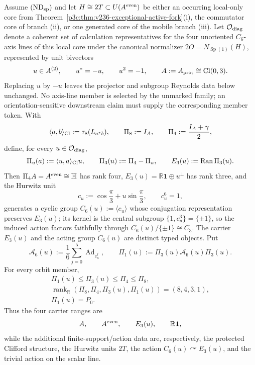 \documentclass[12pt,a4paper]{article}
\begin{document}
\begin{theorem}
\label{p3:thm:derived-active-support}
Assume \((\mathrm{ND}_{\rm sp})\) and let \(H\cong2T\subset
U(A^{\rm even})\) be either an occurring local-only core from
Theorem~\ref{p3c:thm:v236-exceptional-active-fork}(i), the commutator core of
branch (ii), or one generated core of the mobile branch (iii).  Let
\(\mathcal O_{\rm diag}\) denote a coherent set of calculation representatives
for the four unoriented \(C_6\)-axis lines of this local core under the
canonical normalizer \(2O=N_{\operatorname{Sp}(1)}(H)\), represented by unit
bivectors
\[
 u\in A^{(2)},\qquad u^*=-u,\qquad u^2=-1,
 \qquad A:=A_{\rm prot}\cong\operatorname{Cl}(0,3).
\]
Replacing \(u\) by \(-u\) leaves the projector and subgroup Reynolds data below
unchanged.  No axis-line member is selected by the unmarked family; an
orientation-sensitive downstream claim must supply the corresponding member
token.
With
\[
 \langle a,b\rangle_{\rm Cl}:=\tau_8(L_{a^*b}),
 \qquad
 \Pi_8:=I_A,
 \qquad
 \Pi_4:=\frac{I_A+\gamma}{2},
\]
define, for every \(u\in\mathcal O_{\rm diag}\),
\[
 \Pi_u(a):=\langle u,a\rangle_{\rm Cl}u,
 \qquad
 \Pi_3(u):=\Pi_4-\Pi_u,
 \qquad
 E_3(u):=\operatorname{Ran}\Pi_3(u).
\]
Then \(\Pi_4A=A^{\rm even}\cong\mathbb H\) has rank four,
\(E_3(u)=\mathbb R\mathbf1\oplus u^\perp\) has rank three, and the
Hurwitz unit
\[
 c_u:=\cos\frac{\pi}{3}+u\sin\frac{\pi}{3},
 \qquad c_u^6=1,
\]
generates a cyclic group \(C_6(u):=\langle c_u\rangle\) whose conjugation
representation preserves \(E_3(u)\); its kernel is the central subgroup
\(\{1,c_u^3\}=\{\pm1\}\), so the induced action factors faithfully through
\(C_6(u)/\{\pm1\}\cong C_3\).  The carrier \(E_3(u)\) and the acting
group \(C_6(u)\) are distinct typed objects.  Put
\[
 \mathcal A_6(u):=\frac16\sum_{j=0}^{5}\operatorname{Ad}_{c_u^j},
 \qquad
 \Pi_1(u):=\Pi_3(u)\mathcal A_6(u)\Pi_3(u).
\]
For every orbit member,
\begin{equation}
\label{p3:eq:derived-active-projector-chain}
\begin{gathered}
 \Pi_1(u)\le\Pi_3(u)\le\Pi_4\le\Pi_8,\\
 \operatorname{rank}_{\mathbb R}
   (\Pi_8,\Pi_4,\Pi_3(u),\Pi_1(u))=(8,4,3,1),\\
 \boxed{\Pi_1(u)=P_0.}
\end{gathered}
\end{equation}
Thus the four carrier ranges are
\[
 A,\qquad A^{\rm even},\qquad E_3(u),\qquad\mathbb R\mathbf1,
\]
while the additional finite-support/action data are, respectively, the
protected Clifford structure, the Hurwitz units \(2T\), the action
\(C_6(u)\curvearrowright E_3(u)\), and the trivial action on the scalar line.


\end{theorem}
\end{document}
